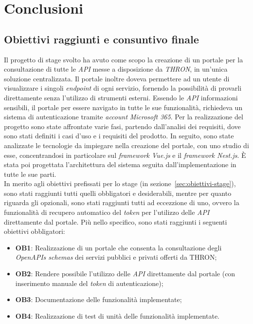 \chapter{Conclusioni}\label{cap:conclusioni}


\section{Obiettivi raggiunti e consuntivo finale}\label{sec:obiettivi-raggiunti}
Il progetto di stage svolto ha avuto come scopo la creazione di un portale per la consultazione di tutte le \textit{API} messe a disposizione da \textit{THRON}, in un'unica soluzione centralizzata. 
Il portale inoltre doveva permettere ad un utente di visualizzare i singoli \textit{endpoint} di ogni servizio, fornendo la possibilità di provarli direttamente senza l'utilizzo di strumenti esterni.
Essendo le \textit{API} informazioni sensibili, il portale per essere navigato in tutte le sue funzionalità, richiedeva un sistema di autenticazione tramite \textit{account} \textit{Microsoft 365}.
Per la realizzazione del progetto sono state affrontate varie fasi, partendo dall'analisi dei requisiti, dove sono stati definiti i casi d'uso e i requisiti del prodotto.
In seguito, sono state analizzate le tecnologie da impiegare nella creazione del portale, con uno studio di esse, concentrandosi in particolare sul \textit{framework Vue.js} e il \textit{framework Nest.js}.
È stata poi progettata l'architettura del sistema seguita dall'implementazione in tutte le sue parti.\\

In merito agli obiettivi prefissati per lo stage (in sezione~\ref{sec:obiettivi-stage}), sono stati raggiunti tutti quelli obbligatori e desiderabili, mentre per quanto riguarda gli opzionali, sono stati raggiunti tutti ad eccezzione di uno, ovvero la funzionalità di recupero automatico del \textit{token} per l'utilizzo delle \textit{API} direttamente dal portale.
Più nello specifico, sono stati raggiunti i seguenti obiettivi obbligatori:
\begin{itemize}
  \item \textbf{OB1}: Realizzazione di un portale che consenta la consultazione degli \textit{OpenAPIs schemas} dei servizi pubblici e privati offerti da THRON;
  \item \textbf{OB2}: Rendere possibile l'utilizzo delle \textit{API} direttamente dal portale (con inserimento manuale del \textit{token} di autenticazione);
  \item \textbf{OB3}: Documentazione delle funzionalità implementate;
  \item \textbf{OB4}: Realizzazione di test di unità delle funzionalità implementate.
\end{itemize}

